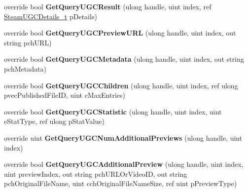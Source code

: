 \begin{DoxyCompactItemize}
override bool {\bfseries Get\+Query\+U\+G\+C\+Result} (ulong handle, uint index, ref \hyperlink{struct_valve_1_1_steamworks_1_1_steam_u_g_c_details__t}{Steam\+U\+G\+C\+Details\+\_\+t} p\+Details)
\item 
\mbox{\label{class_valve_1_1_steamworks_1_1_c_steam_u_g_c_a824ba5f2223022b600e8757c78658c21}} 
override bool {\bfseries Get\+Query\+U\+G\+C\+Preview\+U\+RL} (ulong handle, uint index, out string pch\+U\+RL)
\item 
\mbox{\label{class_valve_1_1_steamworks_1_1_c_steam_u_g_c_a13e842051fa4d64b2fb8943b2f480eae}} 
override bool {\bfseries Get\+Query\+U\+G\+C\+Metadata} (ulong handle, uint index, out string pch\+Metadata)
\item 
\mbox{\label{class_valve_1_1_steamworks_1_1_c_steam_u_g_c_a9de94fba378c9d031513e383917768d7}} 
override bool {\bfseries Get\+Query\+U\+G\+C\+Children} (ulong handle, uint index, ref ulong pvec\+Published\+File\+ID, uint c\+Max\+Entries)
\item 
\mbox{\label{class_valve_1_1_steamworks_1_1_c_steam_u_g_c_a46a2b311cb6c539dd5a4a310c2588607}} 
override bool {\bfseries Get\+Query\+U\+G\+C\+Statistic} (ulong handle, uint index, uint e\+Stat\+Type, ref ulong p\+Stat\+Value)
\item 
\mbox{\label{class_valve_1_1_steamworks_1_1_c_steam_u_g_c_a110bca0f5aa43600d27a29c2434129b3}} 
override uint {\bfseries Get\+Query\+U\+G\+C\+Num\+Additional\+Previews} (ulong handle, uint index)
\item 
\mbox{\label{class_valve_1_1_steamworks_1_1_c_steam_u_g_c_a0e826201101b77172fc92f4fcba0c923}} 
override bool {\bfseries Get\+Query\+U\+G\+C\+Additional\+Preview} (ulong handle, uint index, uint preview\+Index, out string pch\+U\+R\+L\+Or\+Video\+ID, out string pch\+Original\+File\+Name, uint cch\+Original\+File\+Name\+Size, ref uint p\+Preview\+Type)
\item 
\mbox{\label{class_valve_1_1_steamworks_1_1_c_steam_u_g_c_a994948972c0c105e0a84abb68649104e}} 

\end{DoxyCompactItemize}
